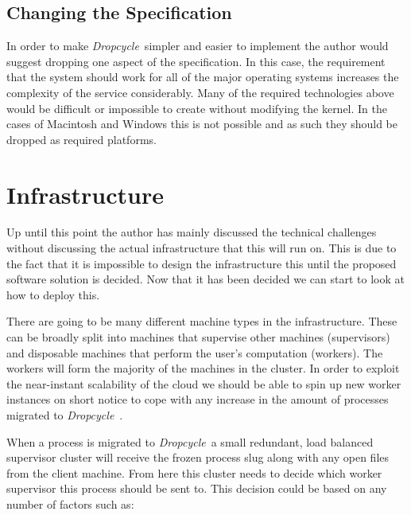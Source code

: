 \documentclass[12pt, a4paper]{article}
\def\dropcycle{\emph{Dropcycle}\ }
\begin{document}
\subsection{Changing the Specification}

In order to make \dropcycle simpler and easier to implement the author would
suggest dropping one aspect of the specification. In this case, the requirement
that the system should work for all of the major operating systems increases
the complexity of the service considerably. Many of the required technologies
above would be difficult or impossible to create without modifying the kernel.
In the cases of Macintosh and Windows this is not possible and as such they
should be dropped as required platforms.

\section{Infrastructure}

Up until this point the author has mainly discussed the technical challenges
without discussing the actual infrastructure that this will run on. This is due
to the fact that it is impossible to design the infrastructure this until the
proposed software solution is decided. Now that it has been decided we can
start to look at how to deploy this.

There are going to be many different machine types in the infrastructure. These
can be broadly split into machines that supervise other machines (supervisors)
and disposable machines that perform the user's computation (workers). The
workers will form the majority of the machines in the cluster. In order to
exploit the near-instant scalability of the cloud we should be able to spin up
new worker instances on short notice to cope with any increase in the amount of
processes migrated to \dropcycle.

When a process is migrated to \dropcycle a small redundant, load balanced
supervisor cluster will receive the frozen process slug along with any open
files from the client machine. From here this cluster needs to decide which
worker supervisor this process should be sent to. This decision could be based
on any number of factors such as:
\end{document}
